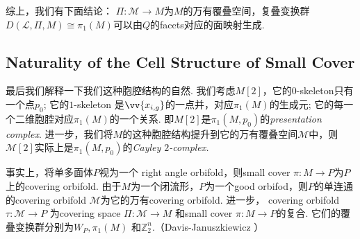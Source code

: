 \documentclass{article}
\theoremstyle{plain}%
\theoremstyle{definition}
\theoremstyle{remark}
\begin{document}








综上，我们有下面结论：
{\thm $\Pi:\mathcal{M}\longrightarrow M$为$M$的万有覆叠空间，复叠变换群$D(\mathcal{L},\Pi,M)\cong\pi_1(M)$可以由$Q$的facets对应的面映射生成.}


\subsection{Naturality of the Cell Structure of Small Cover}
最后我们解释一下我们这种胞腔结构的自然. 我们考虑$M[2]$，它的$0$-skeleton只有一个点$p_0$; 它的$1$-skeleton 是$\vv{x_{i,g}}$的一点并，对应$\pi_1(M)$的生成元; 它的每一个二维胞腔对应$\pi_1(M)$的一个关系. 即$M[2]$是$\pi_1(M,p_0)$的{\em presentation complex}.
进一步，我们将$M$的这种胞腔结构提升到它的万有覆叠空间$\mathcal{M}$中，则$\mathcal{M}[2]$实际上是$\pi_1(M,p_0)$的{\em Cayley $2$-complex.}

事实上，将单多面体$P$视为一个 right angle orbifold，则small cover $\pi:M\longrightarrow P$为$P$上的covering orbifold. 
由于$M$为一个闭流形，$P$为一个good orbifod，则$P$的单连通的covering orbifold $\mathcal{M}$为它的万有covering orbifold.
进一步，
covering orbifold $\tau:\mathcal{M}\longrightarrow P$ 为covering space $\Pi:\mathcal{M}\longrightarrow M$ 和small cover $\pi:M\longrightarrow P$的复合. 
它们的覆叠变换群分别为$W_P, \pi_1(M)$ 和$\mathbb{Z}_2^n$.（Davis-Januszkiewicz \cite{DJ1}）
\end{document}
